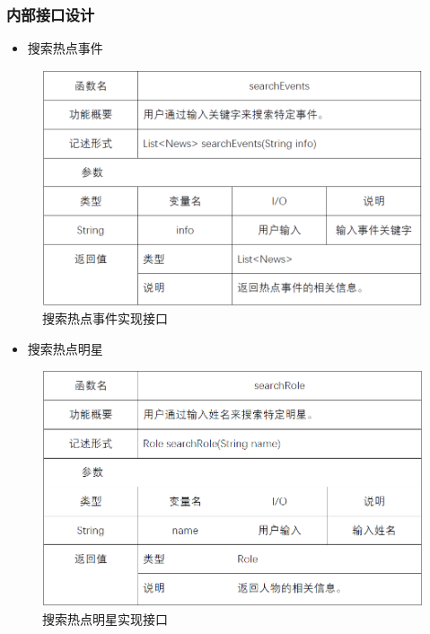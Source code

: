 \subsubsection{内部接口设计}
\begin{itemize} 
	\item 搜索热点事件
\end{itemize}
\begin{figure}[!htbp]
	\centering
	\includegraphics[scale=0.75]{image/b5.png} %
	\caption{搜索热点事件实现接口} %
\end{figure}
\begin{itemize}
	\item 搜索热点明星
\end{itemize}
\begin{figure}[!htbp]
	\centering
	\includegraphics[scale=0.75]{image/b6.png} %
	\caption{搜索热点明星实现接口} %
\end{figure}
